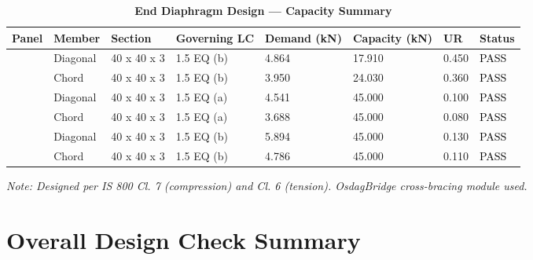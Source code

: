 \documentclass[12pt,a4paper]{report}
\numberwithin{table}{chapter}
\numberwithin{figure}{chapter}
\begin{document}
\vspace{1em}

\begin{longtable}{|C{2.0cm}|L{1.8cm}|C{2.2cm}|C{3.0cm}|C{1.8cm}|C{1.8cm}|C{1.2cm}|C{1.8cm}|}
\caption{\textbf{End Diaphragm Design --- Capacity Summary}}
\hline
\textbf{Panel} & \textbf{Member} & \textbf{Section} & \textbf{Governing LC} & \textbf{Demand (kN)} & \textbf{Capacity (kN)} & \textbf{UR} & \textbf{Status} \\[6pt]
\hline
{} & Diagonal & 40 x 40 x 3 & 1.5 EQ (b) & 4.864 & 17.910 & 0.450 & \textcolor{black}{PASS} \\[6pt]
 & Chord & 40 x 40 x 3 & 1.5 EQ (b) & 3.950 & 24.030 & 0.360 & \textcolor{black}{PASS} \\[6pt]
\hline
{} & Diagonal & 40 x 40 x 3 & 1.5 EQ (a) & 4.541 & 45.000 & 0.100 & \textcolor{black}{PASS} \\[6pt]
 & Chord & 40 x 40 x 3 & 1.5 EQ (a) & 3.688 & 45.000 & 0.080 & \textcolor{black}{PASS} \\[6pt]
\hline
{} & Diagonal & 40 x 40 x 3 & 1.5 EQ (b) & 5.894 & 45.000 & 0.130 & \textcolor{black}{PASS} \\[6pt]
 & Chord & 40 x 40 x 3 & 1.5 EQ (b) & 4.786 & 45.000 & 0.110 & \textcolor{black}{PASS} \\[6pt]
\hline
\end{longtable}
\noindent\textit{Note: Designed per IS 800 Cl. 7 (compression) and Cl. 6 (tension). OsdagBridge cross-bracing module used.}

\section{Overall Design Check Summary}
\label{sec:overall-summary}
\end{document}
